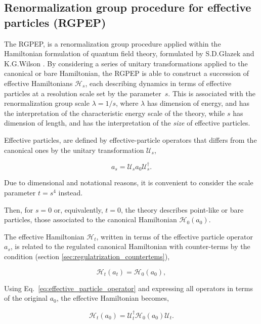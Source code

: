 \documentclass[11pt,a4paper,twoside,pdf]{article}
\numberwithin{equation}{section}
\begin{document}
\subsection{Renormalization group procedure for effective particles (RGPEP)}
\label{sec:rgpep}
The RGPEP, is a renormalization group procedure applied within the Hamiltonian formulation 
of quantum field theory, formulated by S.D.Głazek and K.G.Wilson \cite{Glazek:1997gt,Wilson:1994fk,Glazek:1994qc,PhysRevD.48.5863}. 
By considering a series of unitary transformations applied to the
canonical or bare Hamiltonian, the RGPEP is able to construct a succession of effective 
Hamiltonians $\mathcal{H}_s$, each describing dynamics in terms of effective particles 
at a resolution scale set by the parameter~\( s \). This is associated with the 
renormalization group scale $\lambda = 1/s$, where $\lambda$ has dimension of energy,
and has the interpretation of the characteristic energy scale of the theory, 
while \( s \) has dimension of length, and has the interpretation of the 
\textit{size} of effective particles.

Effective particles, are defined by effective-particle 
operators that differs from the canonical ones by the unitary transformation 
$\mathcal{U}_s$,

\begin{equation}
    a_s = \mathcal{U}_sa_0\mathcal{U}_s^\dagger.
    \label{eq:effective_particle_operator}
\end{equation}

Due to dimensional and notational reasons, it is convenient to consider the scale 
parameter $t = s^4$ instead.

Then, for $s=0$ or, equivalently, $t=0$, the theory describes  point-like or bare particles, 
those associated to the canonical Hamiltonian $\mathcal{H}_0(a_0)$.

The effective Hamiltonian $\mathcal{H}_t$, written in terms of the effective particle
operator $a_s$, is related to the regulated canonical Hamiltonian with counter-terms 
by the condition (section \ref{sec:regulatrization_countertems}),

\begin{equation}
    \mathcal{H}_t(a_t) = \mathcal{H}_0(a_0),
\end{equation}

Using Eq.~\eqref{eq:effective_particle_operator} and expressing all operators in 
terms of the original \( a_0 \), the effective Hamiltonian becomes,

\begin{equation}
    \mathcal{H}_t(a_0) = \mathcal{U}_t^\dagger\mathcal{H}_0(a_0) \mathcal{U}_t.
\end{equation}
\end{document}
